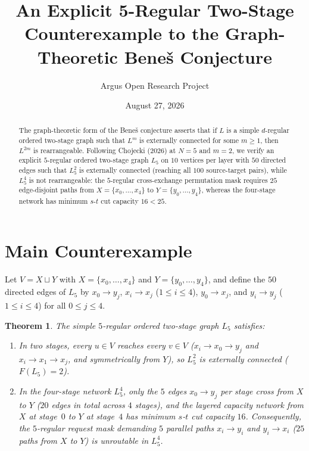 \documentclass[10pt,reqno]{amsart}
\title[An Explicit 5-Regular Two-Stage Counterexample to the Bene\v{s} Conjecture]
{An Explicit 5-Regular Two-Stage Counterexample to the Graph-Theoretic Bene\v{s} Conjecture}
\author{Argus Open Research Project}
\date{August 27, 2026}
\newtheorem{theorem}{Theorem}[section]
\theoremstyle{definition}
\begin{document}
\begin{abstract}
The graph-theoretic form of the Bene\v{s} conjecture asserts that if $L$ is a simple $d$-regular ordered two-stage graph such that $L^m$ is externally connected for some $m\ge 1$, then $L^{2m}$ is rearrangeable. Following Chojecki (2026) at $N=5$ and $m=2$, we verify an explicit $5$-regular ordered two-stage graph $L_5$ on $10$ vertices per layer with $50$ directed edges such that $L_5^2$ is externally connected (reaching all $100$ source-target pairs), while $L_5^4$ is not rearrangeable: the $5$-regular cross-exchange permutation mask requires $25$ edge-disjoint paths from $X=\{x_0,\dots,x_4\}$ to $Y=\{y_0,\dots,y_4\}$, whereas the four-stage network has minimum $s$-$t$ cut capacity $16 < 25$.
\end{abstract}
\maketitle
\section{Main Counterexample}
Let $V = X\sqcup Y$ with $X=\{x_0,\dots,x_4\}$ and $Y=\{y_0,\dots,y_4\}$, and define the $50$ directed edges of $L_5$ by $x_0\to y_j$, $x_i\to x_j$ ($1\le i\le 4$), $y_0\to x_j$, and $y_i\to y_j$ ($1\le i\le 4$) for all $0\le j\le 4$.
\begin{theorem}
The simple $5$-regular ordered two-stage graph $L_5$ satisfies:
\begin{enumerate}[label=\textup{(\arabic*)}]
  \item In two stages, every $u\in V$ reaches every $v\in V$ ($x_i\to x_0\to y_j$ and $x_i\to x_1\to x_j$, and symmetrically from $Y$), so $L_5^2$ is externally connected ($F(L_5)=2$).
  \item In the four-stage network $L_5^4$, only the $5$ edges $x_0\to y_j$ per stage cross from $X$ to $Y$ ($20$ edges in total across $4$ stages), and the layered capacity network from $X$ at stage~$0$ to $Y$ at stage~$4$ has minimum $s$-$t$ cut capacity $16$. Consequently, the $5$-regular request mask demanding $5$ parallel paths $x_i\to y_i$ and $y_i\to x_i$ ($25$ paths from $X$ to $Y$) is unroutable in $L_5^4$.
\end{enumerate}
\end{theorem}
\end{document}
